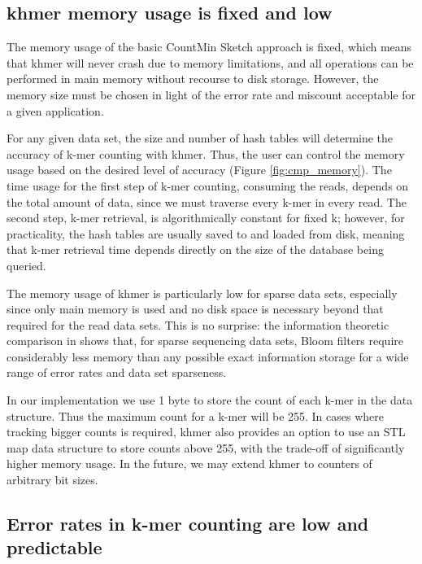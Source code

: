 \documentclass[10pt]{article}
\begin{document}
\subsection*{khmer memory usage is fixed and low}

The memory usage of the basic CountMin Sketch approach is fixed, which
means that khmer will never crash due to memory limitations, and all
operations can be performed in main memory without recourse to disk
storage.  However, the memory size must be chosen in light
of the error rate and miscount acceptable for a given
application.

For any given data set, the size and number of hash tables will
determine the accuracy of k-mer counting with khmer.  Thus, the user
can control the memory usage based on the desired level of
accuracy (Figure \ref{fig:cmp_memory}). The time usage for the first step of k-mer counting,
consuming the reads, depends on the
total amount of data, since we must traverse every k-mer in every read.
The second step, k-mer retrieval, is algorithmically constant for
fixed k; however, for practicality, the hash tables are usually saved
to and loaded from disk, meaning that k-mer retrieval time depends directly
on the size of the database being queried.

The memory usage of khmer is particularly low for sparse data sets,
especially since only main memory is used and no disk space is
necessary beyond that required for the read data sets.  This is no
surprise: the information theoretic comparison in
\cite{Pell2012} shows that, for sparse sequencing data sets, Bloom
filters require considerably less memory than any possible exact
information storage for a wide range of error rates and data set
sparseness.

In our implementation we use 1 byte to store the count of each k-mer
in the data structure. Thus the maximum count for a k-mer will be 255.
In cases where tracking bigger counts is required, khmer also provides
an option to use an STL map data structure to store counts above 255,
with the trade-off of significantly higher memory usage.  In the
future, we may extend khmer to counters of arbitrary bit sizes.


\subsection*{Error rates in k-mer counting are low and predictable}
\end{document}

